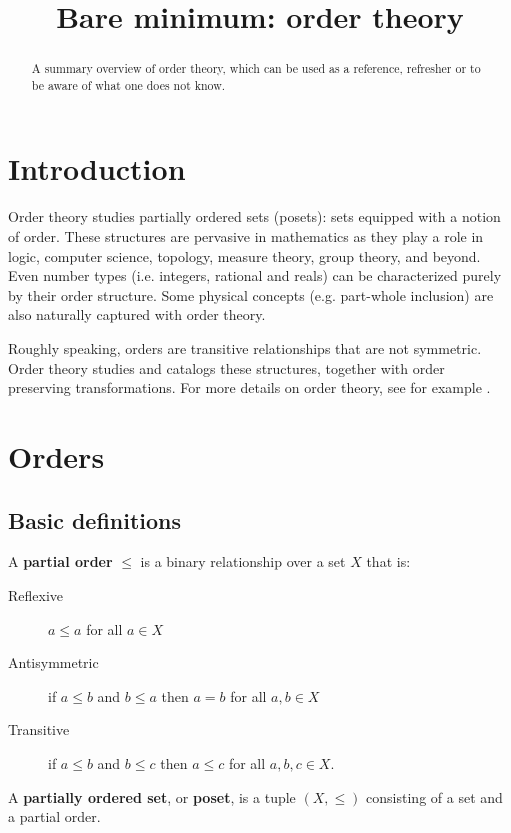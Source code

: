 \documentclass{article}
\title{Bare minimum: order theory}
\date{\vspace{-5ex}}
\newcommand{\marginleft}[1] {\reversemarginpar\marginpar{#1}}
\begin{document}
\maketitle


\begin{abstract}
A summary overview of order theory, which can be used as a reference, refresher or to be aware of what one does not know.
\end{abstract}

\section{Introduction}

Order theory studies partially ordered sets (posets): sets equipped with a notion of order. These structures are pervasive in mathematics as they play a role in logic, computer science, topology, measure theory, group theory, and beyond. Even number types (i.e. integers, rational and reals) can be characterized purely by their order structure. Some physical concepts (e.g. part-whole inclusion) are also naturally captured with order theory.

Roughly speaking, orders are transitive relationships that are not symmetric. Order theory studies and catalogs these structures, together with order preserving transformations. For more details on order theory, see for example \cite{davey2002introduction, pinter2014book}.

\section{Orders}

\subsection{Basic definitions}

\begin{defn}
	A \textbf{partial order} \marginleft{Partial order, poset: $(X, \leq)$} $\leq$ is a binary relationship over a set $X$ that is:
	\begin{description}
		\item[Reflexive] $a \leq a$ for all $a \in X$
		\item[Antisymmetric] if $a \leq b$ and $b \leq a$ then $a = b$ for all $a, b \in X$
		\item[Transitive] if $a \leq b$ and $b \leq c$ then $a \leq c$ for all $a, b, c \in X$.
	\end{description}
	A \textbf{partially ordered set}, or \textbf{poset}, is a tuple $(X, \leq)$ consisting of a set and a partial order.
\end{defn}
\end{document}
